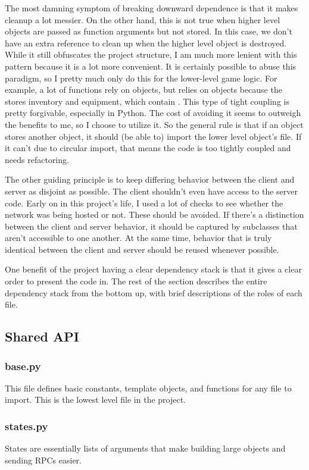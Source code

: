 \documentclass{article}
\begin{document}
The most damning symptom of breaking downward dependence is that it makes cleanup a lot messier.
On the other hand, this is not true when higher level objects are passed as function arguments but
not stored. In this case, we don't have an extra reference to clean up when the higher level
object is destroyed. While it still obfuscates the project structure, I am much more lenient
with this pattern because it is a lot more convenient. It is certainly possible to abuse this
paradigm, so I pretty much only do this for the lower-level game logic.  For example, a lot of
 functions rely on  objects, but  relies
on  objects because the  stores inventory and equipment, which
contain . This type
of tight coupling is pretty forgivable, especially in Python. The cost of avoiding it seems to outweigh
the benefits to me, so I choose to utilize it. So the general rule is that if an object stores another
object, it should (be able to) import the lower level object's file. If it can't due to circular import,
that means the code is too tightly coupled and needs refactoring.

The other guiding principle is to keep differing behavior between the client and server as disjoint as possible.
The client shouldn't even have access to the server code. Early on in this project's life, I used a lot of checks
to see whether the network was being hosted or not. These should be avoided. If there's a distinction between
the client and server behavior, it should be captured by subclasses that aren't accessible to one another.
At the same time, behavior that is truly identical between the client and server should be reused whenever
possible.

One benefit of the project having a clear dependency stack is that it gives a clear order to present the code in.
The rest of the section describes the entire dependency stack from the bottom up, with brief descriptions of the roles
of each file.
\subsection{Shared API}
\subsubsection{base.py}
This file defines basic constants, template objects, and functions for any file to import.
This is the lowest level file in the project.
\subsubsection{states.py}
States are essentially lists of arguments that make building large objects
and sending RPCs easier.
\end{document}
